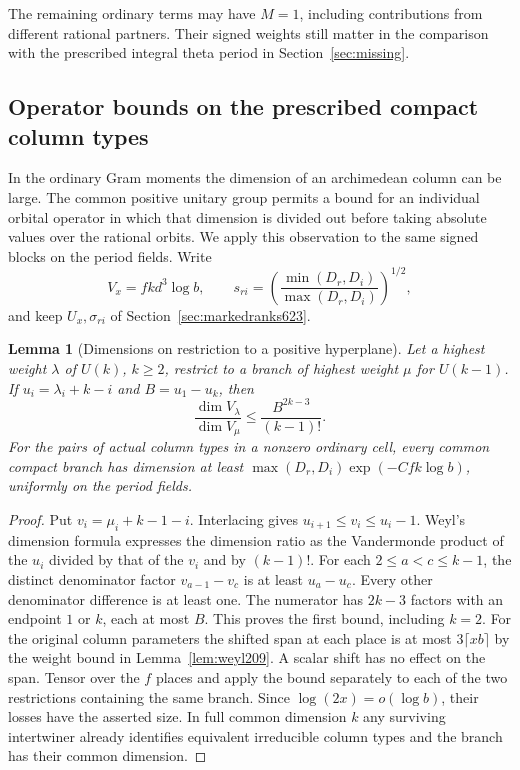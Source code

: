 \documentclass[a4paper,11pt]{article}
\newtheorem{lemma}[proposition]{Lemma}
\theoremstyle{definition}
\theoremstyle{remark}
\numberwithin{equation}{section}
\begin{document}
The remaining ordinary terms may have \(M=1\), including contributions
from different rational partners. Their signed weights still matter
in the comparison with the prescribed integral theta period
in Section~\ref{sec:missing}.


\subsection{Operator bounds on the prescribed compact column types}
\label{sec:compactranks630}

In the ordinary Gram moments the dimension of an archimedean column
can be large. The common positive unitary group permits a bound for
an individual orbital operator in which that dimension is divided
out before taking absolute values over the rational orbits. We apply
this observation to the same signed blocks on the period fields.
Write
\[
        V_x=fk d^3\log b,\qquad
        s_{ri}=\left(\frac{\min(D_r,D_i)}{\max(D_r,D_i)}\right)^{1/2},
\]
and keep \(U_x,\sigma_{ri}\) of Section~\ref{sec:markedranks623}.

\begin{lemma}[Dimensions on restriction to a positive hyperplane]
\leavevmode\label{lem:branchratio630}
Let a highest weight \(\lambda\) of \(U(k)\), \(k\ge2\), restrict
to a branch of highest weight \(\mu\) for \(U(k-1)\).
If \(u_i=\lambda_i+k-i\) and \(B=u_1-u_k\), then
\[
          \frac{\dim V_\lambda}{\dim V_\mu}
                    \le\frac{B^{2k-3}}{(k-1)!}.
\]
For the pairs of actual column types in a nonzero ordinary cell,
every common compact branch has dimension at least
\(\max(D_r,D_i)\exp(-Cfk\log b)\), uniformly on the period fields.
\end{lemma}
\begin{proof}
Put \(v_i=\mu_i+k-1-i\). Interlacing gives
\(u_{i+1}\le v_i\le u_i-1\). Weyl's dimension formula expresses
the dimension ratio as the Vandermonde product of the \(u_i\)
divided by that of the \(v_i\) and by \((k-1)!\).
For each \(2\le a<c\le k-1\), the distinct denominator factor
\(v_{a-1}-v_c\) is at least \(u_a-u_c\).
Every other denominator difference is at least one. The numerator
has \(2k-3\) factors with an endpoint \(1\) or \(k\), each at most
\(B\). This proves the first bound, including \(k=2\).
For the original column parameters the shifted span at each
place is at most \(3\lceil xb\rceil\) by the weight bound in
Lemma~\ref{lem:weyl209}. A scalar shift has no effect on the
span. Tensor over the \(f\) places and apply the bound separately
to each of the two restrictions containing the same branch.
Since \(\log(2x)=o(\log b)\), their losses have the asserted
size. In full common dimension \(k\) any surviving intertwiner
already identifies equivalent irreducible column types and
the branch has their common dimension.
\end{proof}
\end{document}
